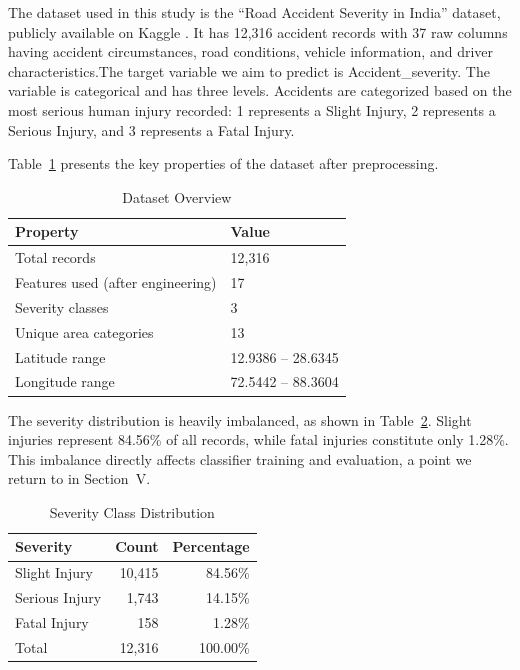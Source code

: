\documentclass[conference]{IEEEtran}
\begin{document}
The dataset used in this study is the ``Road Accident Severity in India'' dataset, publicly available on Kaggle \cite{b19}. It has 12,316 accident records with 37 raw columns having accident circumstances, road conditions, vehicle information, and driver characteristics.The target variable we aim to predict is Accident\_severity. The variable is categorical and has three levels. Accidents are categorized based on the most serious human injury recorded: 1 represents a Slight Injury, 2 represents a Serious Injury, and 3 represents a Fatal Injury.

Table~\ref{tab:dataset_overview} presents the key properties of the dataset after preprocessing.

\begin{table}[htbp]
\caption{Dataset Overview}
\begin{center}
\begin{tabular}{ll}
\toprule
\textbf{Property} & \textbf{Value} \\
\midrule
Total records & 12,316 \\
Features used (after engineering) & 17 \\
Severity classes & 3 \\
Unique area categories & 13 \\
Latitude range & 12.9386 -- 28.6345 \\
Longitude range & 72.5442 -- 88.3604 \\
\bottomrule
\end{tabular}
\label{tab:dataset_overview}
\end{center}
\end{table}

The severity distribution is heavily imbalanced, as shown in Table~\ref{tab:severity_dist}. Slight injuries represent 84.56\% of all records, while fatal injuries constitute only 1.28\%. This imbalance directly affects classifier training and evaluation, a point we return to in Section~V.

\begin{table}[htbp]
\caption{Severity Class Distribution}
\begin{center}
\begin{tabular}{lrr}
\toprule
\textbf{Severity} & \textbf{Count} & \textbf{Percentage} \\
\midrule
Slight Injury & 10,415 & 84.56\% \\
Serious Injury & 1,743 & 14.15\% \\
Fatal Injury & 158 & 1.28\% \\
\midrule
Total & 12,316 & 100.00\% \\
\bottomrule
\end{tabular}
\label{tab:severity_dist}
\end{center}
\end{table}
\end{document}
